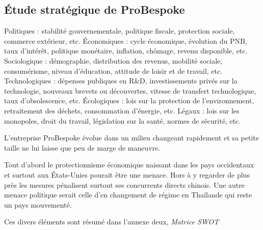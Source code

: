 \subsection{Étude stratégique de ProBespoke}
Politiques : stabilité gouvernementale, politique fiscale, protection sociale, commerce extérieur, etc.
Économiques : cycle économique, évolution du PNB, taux d'intérêt, politique monétaire, inflation, chômage, revenu disponible, etc.
Sociologique : démographie, distribution des revenus, mobilité sociale, consumérisme, niveau d'éducation, attitude de loisir et de travail, etc.
Technologiques : dépenses publiques en R&D, investissements privés sur la technologie, nouveaux brevets ou découvertes, vitesse de transfert technologique, taux d'obsolescence, etc.
Écologiques : lois sur la protection de l'environnement, retraitement des déchets, consommation d'énergie, etc.
Légaux : lois sur les monopoles, droit du travail, législation sur la santé, normes de sécurité, etc.

L'entreprise ProBespoke évolue dans un milieu changeant rapidement et sa petite taille ne lui laisse que peu de marge de maneuvre.

Tout d'abord le protectionnisme économique naissant dans les pays occidentaux et surtout aux États-Unies pourait être une menace. Hors à y regarder de plus près les mesures pénalisent surtout ses concurrents directs chinois. Une autre menace politique serait celle d'en changement de régime en Thaïlande qui reste un pays mouvementé.

Ces divers éléments sont résumé dans l'annexe deux, \textit{Matrice SWOT}

